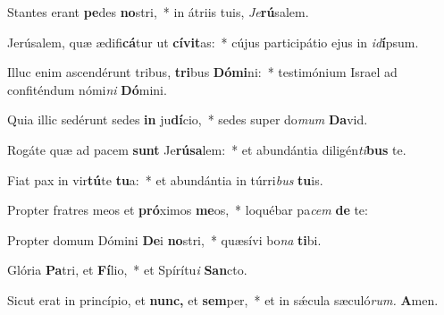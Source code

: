 \item Stantes erant \textbf{pe}des \textbf{no}stri,~* in átriis tuis, \thinspace\textit{Je}\textbf{rú}salem.
\item Jerúsalem, quæ ædifi\textbf{cá}tur ut \textbf{cívit}as:~* cújus participátio ejus in \textit{id}\textbf{í}psum.
\item Illuc enim ascendérunt tribus, \textbf{tri}bus \textbf{Dómi}ni:~* testimónium Israel ad confiténdum nómi\textit{ni} \textbf{Dó}mini.
\item Quia illic sedérunt sedes \textbf{in} ju\textbf{dí}cio,~* sedes super do\textit{mum} \textbf{Da}vid.
\item Rogáte quæ ad pacem \textbf{sunt} Je\textbf{rúsa}lem:~* et abundántia diligén\textit{ti}\textbf{bus} te.
\item Fiat pax in vir\textbf{tú}te \textbf{tu}a:~* et abundántia in túrri\textit{bus} \textbf{tu}is.
\item Propter fratres meos et \textbf{pró}ximos \textbf{me}os,~* loquébar pa\hspace*{0.01em}\textit{cem} \textbf{de} te:
\item Propter domum Dómini \textbf{De}i \textbf{no}stri,~* quæsívi bo\textit{na} \textbf{ti}bi.
\item Glória \textbf{Pa}tri, et \textbf{Fí}lio,~* et Spírítu\textit{i} \textbf{San}cto.
\item Sicut erat in princípio, et \textbf{nunc,} et \textbf{sem}per,~* et in sǽcula sæculó\textit{rum.} \textbf{A}men.